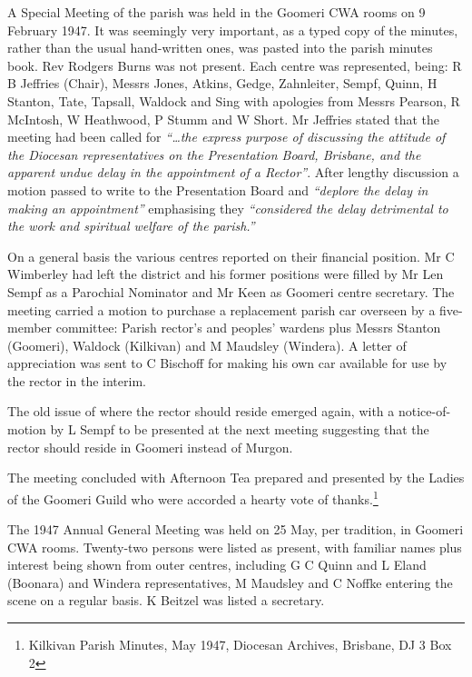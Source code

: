 A Special Meeting of the parish was held in the Goomeri CWA rooms on 9 February 1947. It was seemingly very important, as a typed copy of the minutes, rather than the usual hand-written ones, was pasted into the parish minutes book. Rev Rodgers Burns was not present. Each centre was represented, being: R B Jeffries (Chair), Messrs Jones, Atkins, Gedge, Zahnleiter, Sempf, Quinn, H Stanton, Tate, Tapsall, Waldock and Sing with apologies from Messrs Pearson, R McIntosh, W Heathwood, P Stumm and W Short. Mr Jeffries stated that the meeting had been called for \emph{``\ldots the express purpose of discussing the attitude of the Diocesan representatives on the Presentation Board, Brisbane, and the apparent undue delay in the appointment of a Rector''}. After lengthy discussion a motion passed to write to the Presentation Board and \emph{``deplore the delay in making an appointment''} emphasising they \emph{``considered the delay detrimental to the work and spiritual welfare of the parish.''}



On a general basis the various centres reported on their financial position. Mr C Wimberley had left the district and his former positions were filled by Mr Len Sempf as a Parochial Nominator and Mr Keen as Goomeri centre secretary. The meeting carried a motion to purchase a replacement parish car overseen by a five-member committee: Parish rector's and peoples' wardens plus Messrs Stanton (Goomeri), Waldock (Kilkivan) and M Maudsley (Windera). A letter of appreciation was sent to C Bischoff for making his own car available for use by the rector in the interim.



The old issue of where the rector should reside emerged again, with a notice-of-motion by L Sempf to be presented at the next meeting suggesting that the rector should reside in Goomeri instead of Murgon.



The meeting concluded with Afternoon Tea prepared and presented by the Ladies of the Goomeri Guild who were accorded a hearty vote of thanks.\footnote{Kilkivan Parish Minutes, May 1947, Diocesan Archives, Brisbane, DJ 3 Box 2}


The 1947 Annual General Meeting was held on 25 May, per tradition, in Goomeri CWA rooms. Twenty-two persons were listed as present, with familiar names plus interest being shown from outer centres, including G C Quinn and L Eland (Boonara) and Windera representatives, M Maudsley and C Noffke entering the scene on a regular basis. K Beitzel was listed a secretary.



